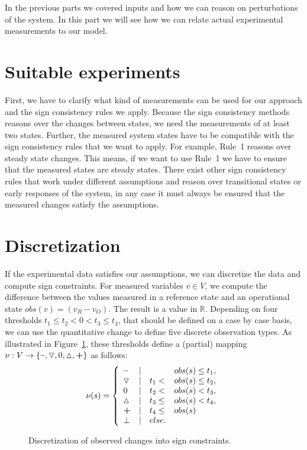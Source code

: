 In the previous parts we covered inputs and how we can reason on perturbations of the system.
In this part we will see how we can relate actual experimental measurements to our model.

\section*{Suitable experiments}

First, we have to clarify what kind of measurements can be used for our approach and the sign consistency rules we apply.
Because the sign consistency methods reasons over the changes between states,
 we need the measurements of at least two states.
Further, the measured system states have to be compatible with the sign consistency rules that we want to apply.
For example, Rule~1 reasons over steady state changes. 
This means, if we want to use Rule~1 we have to ensure that the measured states are steady states.
There exist other sign consistency rules that work under different assumptions and reason over transitional states or early responses of the system,
 in any case it must always be ensured that the measured changes satisfy the assumptions.

 
\section*{Discretization} 

If the experimental data satisfies our assumptions, we can discretize the data and compute sign constraints.
For measured variables $v \in V$,
 we compute the difference between the values measured in a reference state and an operational state $obs(v) = (v_R - v_O)$.
The result is a value in $\mathbb{R}$. 
Depending on four thresholds $t_1 \leq t_2 < 0 < t_3 \leq t_4$, that should be defined on a case by case basis,
 we can use the quantitative change to define five discrete observation types.
As illustrated in Figure~\ref{fig:sign_discretization}, 
these thresholds define a (partial) mapping $\nu: V \rightarrow \{ \minus, \uncertaindecrease, 0, \uncertainincrease, \plus \}$ as follows:
\[
\nu(s)=\left \{
\begin{array}{lll}
    \minus              & |\quad        & obs(s) \leq t_1, \\  
    \uncertaindecrease  & |\quad t_1 <  & obs(s) \leq t_2,\\
    0                   & |\quad t_2 <  & obs(s) < t_3, \\
    \uncertainincrease  & |\quad t_3 \leq & obs(s) < t_4,\\
    \plus               & |\quad t_4 \leq & obs(s) \\
    \bot                & |\quad else.
\end{array} \right . 
\]
%
  \begin{figure}[h!]
  \centering
  
  \caption{Discretization of observed changes into sign constraints.}
  \label{fig:sign_discretization}
  \end{figure} 

